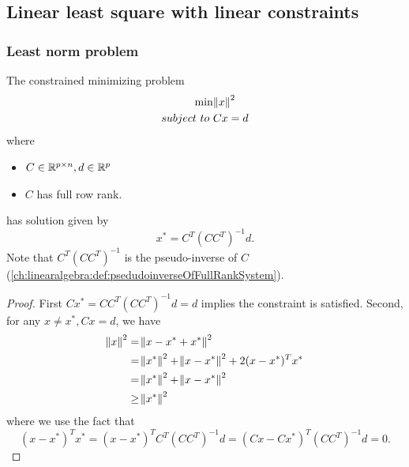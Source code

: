 \begin{refsection}
\subsection{Linear least square with linear constraints}
\subsubsection{Least norm problem}
\begin{lemma}
The constrained minimizing problem
\begin{align*}
\min & \norm{x}^2 \\
subject~to~ & Cx = d
\end{align*}	
where
\begin{itemize}
	\item $C \in \mathbb{R}^{p\times n}, d\in \mathbb{R}^p$
	\item $C$ has full row rank. 
\end{itemize}
has solution given by
$$x^* = C^T(CC^T)^{-1}d.$$
Note that $C^T(CC^T)^{-1}$ is the pseudo-inverse of $C$(\autoref{ch:linearalgebra:def:psedudoinverseOfFullRankSystem}).
\end{lemma}
\begin{proof}
First $Cx^* = CC^T(CC^T)^{-1}d = d$ implies the constraint is satisfied. Second, for any $x\neq x^*, Cx = d$, we have 
\begin{align*}
\norm{x}^2 &=\norm{x - x^* + x^*}^2 \\
&=\norm{x^*}^2 +\norm{x - x^*}^2 + 2(x-x^*)^Tx^* \\
&=\norm{x^*}^2 +\norm{x - x^*}^2 \\
&\geq \norm{x^*}^2
\end{align*}
where we use the fact that $$(x-x^*)^Tx^* = (x-x^*)^TC^T(CC^T)^{-1}d =(Cx-Cx^*)^T(CC^T)^{-1}d = 0.$$
\end{proof}



\end{refsection}
